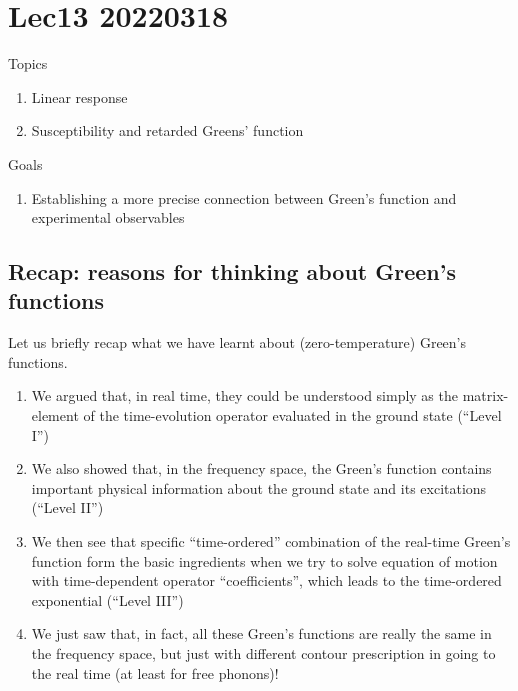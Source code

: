 \chapter{Lec13 20220318}

Topics

\begin{enumerate}
    \item Linear response
    \item Susceptibility and retarded Greens' function
\end{enumerate}

Goals

\begin{enumerate}
    \item Establishing a more precise connection between Green's function and experimental observables
\end{enumerate}

\section{Recap: reasons for thinking about Green's functions}

Let us briefly recap what we have learnt about (zero-temperature) Green's functions.

\begin{enumerate}
    \item We argued that, in real time, they could be understood simply as the matrix-element of the time-evolution operator evaluated in the ground state (``Level I'')
    \item We also showed that, in the frequency space, the Green's function contains important physical information about the ground state and its excitations (``Level II'')
    \item We then see that specific ``time-ordered'' combination of the real-time Green's function form the basic ingredients when we try to solve equation of motion with time-dependent operator ``coefficients'', which leads to the time-ordered exponential (``Level III'')
    \item We just saw that, in fact, all these Green's functions are really the same in the frequency space, but just with different contour prescription in going to the real time (at least for free phonons)!
\end{enumerate}

